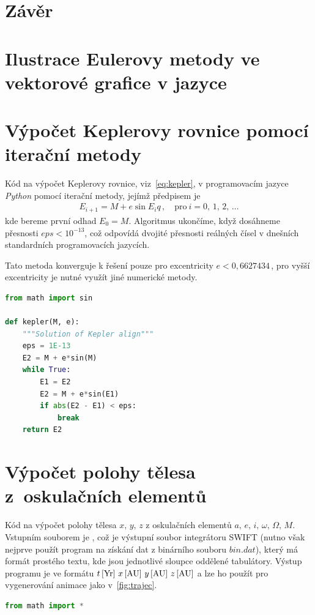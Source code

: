 \documentclass[A4paper, 12pt, oneside]{book}
\begin{document}
\chapter{Závěr}

\newpage

\printbibliography
\begin{appendices}
	\chapter{Ilustrace Eulerovy metody ve vektorové grafice v jazyce } \label{app:asy}

	\begin{figure}[!htb]
	\centering
	\end{figure}

	

	\chapter{Výpočet Keplerovy rovnice pomocí iterační metody} \label{app:kepit}
	Kód na výpočet Keplerovy rovnice, viz~\eqref{eq:kepler}, v programovacím jazyce \textit{Python} pomocí iterační metody, jejímž předpisem je
	\begin{align*}
		E_{i+1}=M+e\sin{E_i}q\,, \quad \text{pro}\ i=0,\,1,\,2,\,\ldots
	\end{align*}
	kde bereme první odhad $E_0=M$. Algoritmus ukončíme, když dosáhneme přesnosti ${eps<10^{-13}}$, což odpovídá dvojité přesnosti reálných čísel v dnešních standardních programovacích jazycích.

	Tato metoda konverguje k řešení pouze pro excentricity $e<0,6627434\,$, pro vyšší excentricity je nutné využít jiné numerické metody.
\begin{lstlisting}[language=Python]
from math import sin

def kepler(M, e):
    """Solution of Kepler align"""
    eps = 1E-13
    E2 = M + e*sin(M)
    while True:
        E1 = E2
        E2 = M + e*sin(E1)
        if abs(E2 - E1) < eps:
            break 
    return E2
\end{lstlisting}
	\chapter{Výpočet polohy tělesa z~oskulačních elementů} \label{app:el2xyz}
	Kód na výpočet polohy tělesa $x,\,y,\,z$ z oskulačních elementů $a,\,e,\,i,\,\omega,\,\Omega,\,M$. Vstupním souborem je , což je výstupní soubor integrátoru SWIFT (nutno však nejprve použít program  na získání dat z binárního souboru $bin.dat$), který má formát prostého textu, kde jsou jednotlivé sloupce oddělené tabulátory. Výstup programu je ve formátu $t\,[{\rm Yr}]\ x\,[{\rm AU}]\ y\,[{\rm AU}]\ z\,[{\rm AU}]$ a lze ho použít pro vygenerování animace jako v~\ref{fig:trajec}.
	\begin{lstlisting}[language=Python]
from math import *


\end{lstlisting}
\end{appendices}
\end{document}
